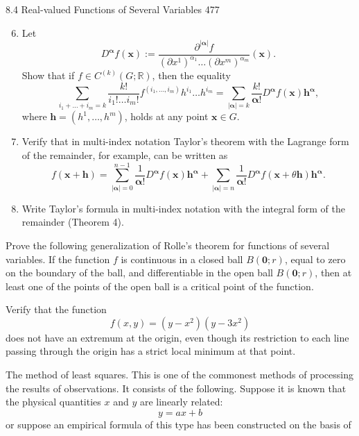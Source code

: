 8.4 Real-valued Functions of Several Variables
477
    \begin{enumerate}
        \setcounter{enumi}{5}
        \renewcommand{\theenumi}{\alph{enumi}}
        \item Let
        \[
        D^\mathbf{\alpha} f(\mathbf{x}) := \frac{\partial^{|\mathbf{\alpha}|} f}{(\partial x^1)^{\alpha_1} \ldots (\partial x^m)^{\alpha_m}}(\mathbf{x}).
        \]
        Show that if $f \in C^{(k)}(G; \mathbb{R})$, then the equality
        \[
        \sum_{i_1 + \ldots + i_m = k} \frac{k!}{i_1! \ldots i_m!} f^{(i_1, \ldots, i_m)} h^{i_1} \ldots h^{i_m} = \sum_{|\mathbf{\alpha}|=k} \frac{k!}{\mathbf{\alpha}!} D^\mathbf{\alpha} f(\mathbf{x}) \mathbf{h}^\mathbf{\alpha},
        \]
        where $\mathbf{h} = (h^1, \ldots, h^m)$, holds at any point $\mathbf{x} \in G$.
        \item Verify that in multi-index notation Taylor's theorem with the Lagrange form
        of the remainder, for example, can be written as
        \[
        f(\mathbf{x} + \mathbf{h}) = \sum_{|\mathbf{\alpha}|=0}^{n-1} \frac{1}{\mathbf{\alpha}!} D^\mathbf{\alpha} f(\mathbf{x}) \mathbf{h}^\mathbf{\alpha} + \sum_{|\mathbf{\alpha}|=n} \frac{1}{\mathbf{\alpha}!} D^\mathbf{\alpha} f(\mathbf{x} + \theta \mathbf{h}) \mathbf{h}^\mathbf{\alpha}.
        \]
        \item Write Taylor's formula in multi-index notation with the integral form of the
        remainder (Theorem 4).
    \end{enumerate}
    \item Prove the following generalization of Rolle's theorem for functions of several
    variables.
    If the function $f$ is continuous in a closed ball $B(\mathbf{0}; r)$, equal to zero on the
    boundary of the ball, and differentiable in the open ball $B(\mathbf{0}; r)$, then at least one of
    the points of the open ball is a critical point of the function.
    \item Verify that the function
    \[
    f(x, y) = (y - x^2)(y - 3x^2)
    \]
    does not have an extremum at the origin, even though its restriction to each line
    passing through the origin has a strict local minimum at that point.
    \item The method of least squares. This is one of the commonest methods of processing
    the results of observations. It consists of the following. Suppose it is known that the
    physical quantities $x$ and $y$ are linearly related:
    \[
    y = ax + b \tag{8.79}
    \]
    or suppose an empirical formula of this type has been constructed on the basis of
